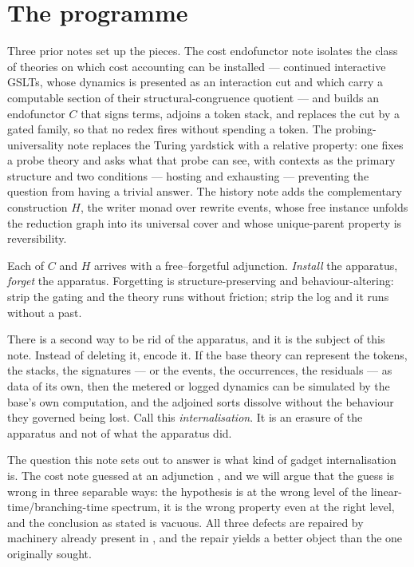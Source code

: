 \documentclass[11pt,a4paper]{article}
\theoremstyle{definition}
\theoremstyle{plain}
\theoremstyle{remark}
\begin{document}
\tableofcontents

\section{The programme}
\label{sec:programme}

Three prior notes set up the pieces. The cost endofunctor note \cite{cost} isolates the class of
theories on which cost accounting can be installed --- continued interactive GSLTs, whose dynamics
is presented as an interaction cut and which carry a computable section of their
structural-congruence quotient --- and builds an endofunctor $C$ that signs terms, adjoins a token
stack, and replaces the cut by a gated family, so that no redex fires without spending a token.
The probing-universality note \cite{probe} replaces the Turing yardstick with a relative property:
one fixes a probe theory and asks what that probe can see, with contexts as the primary structure
and two conditions --- hosting and exhausting --- preventing the question from having a trivial
answer. The history note \cite{history} adds the complementary construction $H$, the writer monad
over rewrite events, whose free instance unfolds the reduction graph into its universal cover and
whose unique-parent property is reversibility.

Each of $C$ and $H$ arrives with a free--forgetful adjunction. \emph{Install} the apparatus,
\emph{forget} the apparatus. Forgetting is structure-preserving and behaviour-altering: strip the
gating and the theory runs without friction; strip the log and it runs without a past.

There is a second way to be rid of the apparatus, and it is the subject of this note. Instead of
deleting it, encode it. If the base theory can represent the tokens, the stacks, the signatures ---
or the events, the occurrences, the residuals --- as data of its own, then the metered or logged
dynamics can be simulated by the base's own computation, and the adjoined sorts dissolve without
the behaviour they governed being lost. Call this \emph{internalisation}. It is an erasure of the
apparatus and not of what the apparatus did.

The question this note sets out to answer is what kind of gadget internalisation is. The cost note
guessed at an adjunction \cite[\S9.3]{cost}, and we will argue that the guess is wrong in three
separable ways: the hypothesis is at the wrong level of the linear-time/branching-time spectrum,
it is the wrong property even at the right level, and the conclusion as stated is vacuous. All
three defects are repaired by machinery already present in \cite{probe}, and the repair yields a
better object than the one originally sought.
\end{document}
